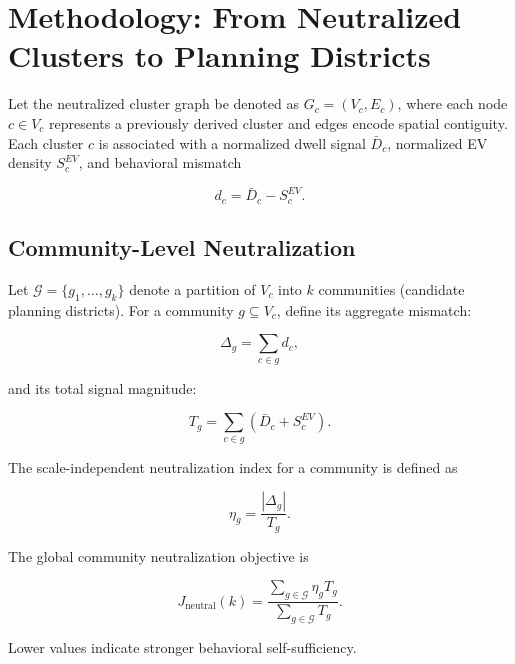 \documentclass[conference]{IEEEtran}
\begin{document}
\section{Methodology: From Neutralized Clusters to Planning Districts}

Let the neutralized cluster graph be denoted as 
$G_c = (V_c, E_c)$, where each node $c \in V_c$ represents a previously derived cluster and edges encode spatial contiguity. 
Each cluster $c$ is associated with a normalized dwell signal $\bar{D}_c$, normalized EV density $S_c^{EV}$, and behavioral mismatch

\begin{equation}
d_c = \bar{D}_c - S_c^{EV}.
\label{eq:cluster_mismatch}
\end{equation}

\subsection{Community-Level Neutralization}

Let $\mathcal{G} = \{ g_1, \dots, g_k \}$ denote a partition of $V_c$ into $k$ communities (candidate planning districts). 
For a community $g \subseteq V_c$, define its aggregate mismatch:

\begin{equation}
\Delta_g = \sum_{c \in g} d_c,
\label{eq:community_mismatch}
\end{equation}

and its total signal magnitude:

\begin{equation}
T_g = \sum_{c \in g} \left( \bar{D}_c + S_c^{EV} \right).
\label{eq:community_mass}
\end{equation}

The scale-independent neutralization index for a community is defined as

\begin{equation}
\eta_g = \frac{|\Delta_g|}{T_g}.
\label{eq:eta_g}
\end{equation}

The global community neutralization objective is

\begin{equation}
J_{\text{neutral}}(k) =
\frac{\sum_{g \in \mathcal{G}} \eta_g T_g}
{\sum_{g \in \mathcal{G}} T_g}.
\label{eq:J_neutral}
\end{equation}

Lower values indicate stronger behavioral self-sufficiency.
\end{document}
